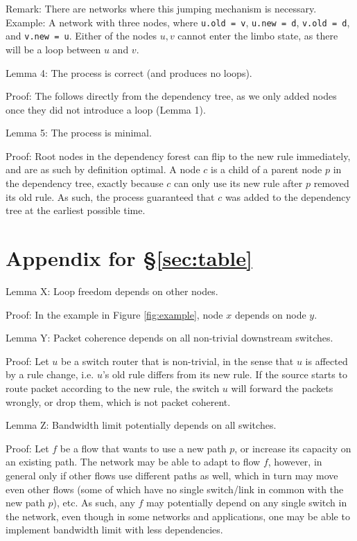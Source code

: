 Remark: There are networks where this jumping mechanism is necessary. Example: A network with three nodes, where \texttt{u.old = v}, \texttt{u.new = d}, \texttt{v.old = d}, and \texttt{v.new = u}. Either of the nodes $u,v$ cannot enter the limbo state, as there will be a loop between $u$ and $v$.

Lemma 4: The process is correct (and produces no loops).

Proof: The follows directly from the dependency tree, as we only added nodes once they did not introduce a loop (Lemma 1).

Lemma 5: The process is minimal.

Proof: Root nodes in the dependency forest can flip to the new rule immediately, and are as such by definition optimal. A node $c$ is a child of a parent node $p$ in the dependency tree, exactly because $c$ can only use its new rule after $p$ removed its old rule. As such, the process guaranteed that $c$ was added to the dependency tree at the earliest possible time.

\section{Appendix for \S\ref{sec:table}}
\label{sec:app2}


Lemma X: Loop freedom depends on other nodes.

Proof: In the example in Figure \ref{fig:example}, node $x$ depends on node $y$.

Lemma Y: Packet coherence depends on all non-trivial downstream switches.

Proof: Let $u$ be a switch router that is non-trivial, in the sense that $u$ is affected by a rule change, i.e. $u$'s old rule differs from its new rule. If the source starts to route packet according to the new rule, the switch $u$ will forward the packets wrongly, or drop them, which is not packet coherent.

Lemma Z: Bandwidth limit potentially depends on all switches.

Proof: Let $f$ be a flow that wants to use a new path $p$, or increase its capacity on an existing path. The network may be able to adapt to flow $f$, however, in general only if other flows use different paths as well, which in turn may move even other flows (some of which have no single switch/link in common with the new path $p$), etc. As such, any $f$ may potentially depend on any single switch in the network, even though in some networks and applications, one may be able to implement bandwidth limit with less dependencies.

